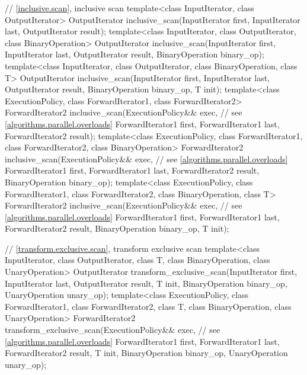 \begin{codeblock}
{  // \ref{inclusive.scan}, inclusive scan
  template<class InputIterator, class OutputIterator>
    OutputIterator inclusive_scan(InputIterator first, InputIterator last,
                                  OutputIterator result);
  template<class InputIterator, class OutputIterator, class BinaryOperation>
    OutputIterator inclusive_scan(InputIterator first, InputIterator last,
                                  OutputIterator result,
                                  BinaryOperation binary_op);
  template<class InputIterator, class OutputIterator, class BinaryOperation, class T>
    OutputIterator inclusive_scan(InputIterator first, InputIterator last,
                                  OutputIterator result,
                                  BinaryOperation binary_op, T init);
  template<class ExecutionPolicy, class ForwardIterator1, class ForwardIterator2>
    ForwardIterator2 inclusive_scan(ExecutionPolicy&& exec, // see \ref{algorithms.parallel.overloads}
                                    ForwardIterator1 first, ForwardIterator1 last,
                                    ForwardIterator2 result);
  template<class ExecutionPolicy, class ForwardIterator1, class ForwardIterator2,
           class BinaryOperation>
    ForwardIterator2 inclusive_scan(ExecutionPolicy&& exec, // see \ref{algorithms.parallel.overloads}
                                    ForwardIterator1 first, ForwardIterator1 last,
                                    ForwardIterator2 result,
                                    BinaryOperation binary_op);
  template<class ExecutionPolicy, class ForwardIterator1, class ForwardIterator2,
           class BinaryOperation, class T>
    ForwardIterator2 inclusive_scan(ExecutionPolicy&& exec, // see \ref{algorithms.parallel.overloads}
                                    ForwardIterator1 first, ForwardIterator1 last,
                                    ForwardIterator2 result,
                                    BinaryOperation binary_op, T init);

  // \ref{transform.exclusive.scan}, transform exclusive scan
  template<class InputIterator, class OutputIterator, class T,
           class BinaryOperation, class UnaryOperation>
    OutputIterator transform_exclusive_scan(InputIterator first, InputIterator last,
                                            OutputIterator result,
                                            T init,
                                            BinaryOperation binary_op,
                                            UnaryOperation unary_op);
  template<class ExecutionPolicy,
           class ForwardIterator1, class ForwardIterator2, class T,
           class BinaryOperation, class UnaryOperation>
    ForwardIterator2 transform_exclusive_scan(ExecutionPolicy&& exec, // see \ref{algorithms.parallel.overloads}
                                              ForwardIterator1 first, ForwardIterator1 last,
                                              ForwardIterator2 result,
                                              T init,
                                              BinaryOperation binary_op,
                                              UnaryOperation unary_op);

}
\end{codeblock}
